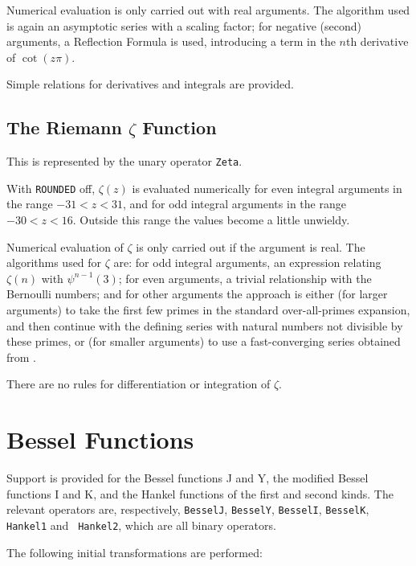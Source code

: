 \documentclass[11pt]{article}
\begin{document}
Numerical evaluation is only carried out with real arguments. The
algorithm used is again an asymptotic series with a scaling factor; for
negative (second) arguments, a Reflection Formula is used, introducing a
term in the $n$th derivative of $\cot(z\pi)$.

Simple relations for derivatives and integrals are provided.


\subsection{The Riemann $\zeta$ Function}

This is represented by the unary operator {\tt Zeta}.

With {\tt ROUNDED} off, $\zeta(z)$ is evaluated numerically for even
integral arguments in the range $-31 < z < 31$, and for odd integral
arguments in the range $-30 < z < 16$.  Outside this range the values
become a little unwieldy.

Numerical evaluation of $\zeta$ is only carried out if the argument is real.
The algorithms used for $\zeta$ are: for odd integral arguments, an
expression relating $\zeta(n)$ with $\psi^{n-1}(3)$; for even arguments, a
trivial relationship with the Bernoulli numbers; and for other arguments the
approach is either (for larger arguments) to take the first few primes in
the standard over-all-primes expansion, and then continue with the defining
series with natural numbers not divisible by these primes, or (for smaller
arguments) to use a fast-converging series obtained from \cite{Bender:78}.

There are no rules for differentiation or integration of $\zeta$.


\section{Bessel Functions}

Support is provided for the Bessel functions J and Y, the modified
Bessel functions I and K, and the Hankel functions of the first and
second kinds.  The relevant operators are, respectively, {\tt BesselJ},
{\tt BesselY}, {\tt BesselI}, {\tt BesselK}, {\tt Hankel1} and {\tt
Hankel2}, which are all binary operators.

The following initial transformations are performed:
\end{document}
